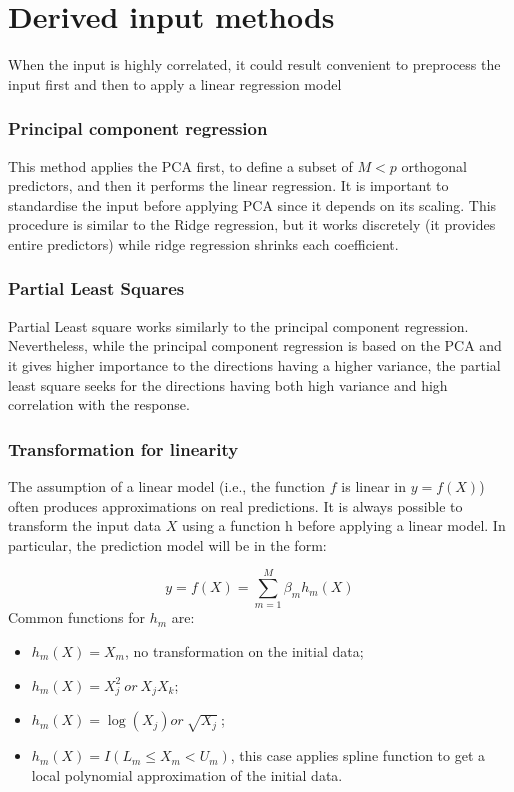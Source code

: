 \section{Derived input methods}
When the input is highly correlated, it could result convenient to preprocess the input first and then to apply a linear regression model

\subsubsection{Principal component regression}
This method applies the PCA first, to define a subset of $M<p$ orthogonal predictors, and then it performs the linear regression. It is important to standardise the input before applying PCA since it depends on its scaling. This procedure is similar to the Ridge regression, but it works discretely (it provides entire predictors) while ridge regression shrinks each coefficient.

\subsubsection{Partial Least Squares}
Partial Least square works similarly to the principal component regression. Nevertheless, while the principal component regression is based on the PCA and it gives higher importance to the directions having a higher variance, the partial least square seeks for the directions having both high variance and high correlation with the response.

\subsubsection{Transformation for linearity}
The assumption of a linear model (i.e., the function $f$ is linear in $y=f(X)$) often produces approximations on real predictions. It is always possible to transform the input data $X$ using a function h before applying a linear model. In particular, the prediction model will be in the form:

\begin{equation}
y=f\left(X\right)=\sum_{m=1}^{M}{\beta_mh_m(X)}
\label{eq_transformationForLinearity}
\end{equation}
Common functions for $h_m$ are:
\begin{itemize}
    \item $h_m(X)=X_m$, no transformation on the initial data;
    \item $h_m\left(X\right)=X_j^2\ or\ X_jX_k$;
    \item $h_m\left(X\right)=\log{\left(X_j\right)}or\ \sqrt{X_j}\ $;
    \item $h_m\left(X\right)=I(L_m\le X_m<U_m)$, this case applies spline function to get a local polynomial approximation of the initial data.
\end{itemize}

